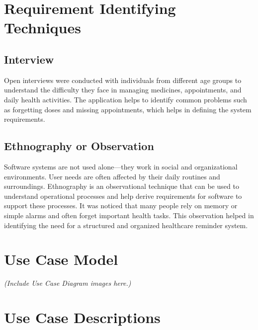 \documentclass[12pt, a4paper, oneside]{report}
\begin{document}
\section{Requirement Identifying Techniques}
\label{sec:req-techniques}

\subsection{Interview}
Open interviews were conducted with individuals from different age groups to understand the difficulty they face in managing medicines, appointments, and daily health activities. The application helps to identify common problems such as forgetting doses and missing appointments, which helps in defining the system requirements.

\subsection{Ethnography or Observation}
Software systems are not used alone---they work in social and organizational environments. User needs are often affected by their daily routines and surroundings. Ethnography is an observational technique that can be used to understand operational processes and help derive requirements for software to support these processes. It was noticed that many people rely on memory or simple alarms and often forget important health tasks. This observation helped in identifying the need for a structured and organized healthcare reminder system.

\section{Use Case Model}
\label{sec:use-case-model}


\textit{(Include Use Case Diagram images here.)}

\section{Use Case Descriptions}
\label{sec:use-case-desc}

\end{document}
